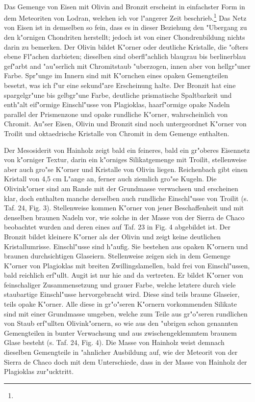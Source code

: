 \documentclass[a4paper, 11pt, oneside, polutonikogreek, german]{article}
\begin{document}
\paragraph{}
Das Gemenge von Eisen mit Olivin and Bronzit erscheint in einfachster Form in dem Meteoriten von Lodran, welchen ich vor l"angerer Zeit beschrieb.\footnote{} Das Netz von Eisen ist in demselben so fein, dass es in dieser Beziehung den "Ubergang zu den k"ornigen Chondriten herstellt; jedoch ist von einer Chondrenbildung nichts darin zu bemerken. Der Olivin bildet K"orner oder deutliche Kristalle, die "ofters ebene Fl"achen darbieten; dieselben sind oberfl"achlich blaugrau bis berlinerblau gef"arbt and "au"serlich mit Chromitstaub "uberzogen, innen aber von hellgr"uner Farbe. Spr"unge im Innern sind mit K"ornchen eines opaken Gemengteilen besetzt, was ich f"ur eine sekund"are Erscheinung halte. Der Bronzit hat eine spargelgr"une bis gelbgr"une Farbe, deutliche prismatische Spaltbarkeit und enth"alt eif"ormige Einschl"usse von Plagioklas, haarf"ormige opake Nadeln parallel der Prismenzone und opake rundliche K"orner, wahrscheinlich von Chromit. Au"ser Eisen, Olivin und Bronzit sind noch untergeordnet K"orner von Troilit und oktaedrische Kristalle von Chromit in dem Gemenge enthalten.

Der Mesosiderit von Hainholz zeigt bald ein feineres, bald ein gr"oberes Eisennetz von k"orniger Textur, darin ein k"orniges Silikatgemenge mit Troilit, stellenweise aber auch gro"se K"orner und Kristalle von Olivin liegen. Reichenbach gibt einen Kristall von 4,5 cm L"ange an, ferner auch ziemlich gro"se Kugeln. Die Olivink"orner sind am Rande mit der Grundmasse verwachsen und erscheinen klar, doch enthalten manche derselben auch rundliche Einschl"usse von Troilit (s. Taf. 24, Fig. 3). Stellenweise kommen K"orner von jener Beschaffenheit und mit denselben braunen Nadeln vor, wie solche in der Masse von der Sierra de Chaco beobachtet wurden and deren eines auf Taf. 23 in Fig. 4 abgebildet ist. Der Bronzit bildet kleinere K"orner als der Olivin und zeigt keine deutlichen Kristallumrisse. Einschl"usse sind h"aufig. Sie bestehen aus opaken K"ornern und braunen durchsichtigen Glaseiern. Stellenweise zeigen sich in dem Gemenge K"orner von Plagioklas mit breiten Zwillingslamellen, bald frei von Einschl"ussen, bald reichlich erf"ullt. Augit ist nur hie and da vertreten. Er bildet K"orner von feinschaliger Zusammensetzung und grauer Farbe, welche letztere durch viele staubartige Einschl"usse hervorgebracht wird. Diese sind teils braune Glaseier, teils opake K"orner. Alle diese in gr"o"seren K"ornern vorkommenden Silikate sind mit einer Grundmasse umgeben, welche zum Teile aus gr"o"seren rundlichen von Staub erf"ullten Olivink"ornern, so wie aus den "ubrigen schon genannten Gemengteilen in bunter Verwachsung und aus zwischengeklemmtem braunem Glase besteht (s. Taf. 24, Fig. 4). Die Masse von Hainholz weist demnach dieselben Gemengteile in "ahnlicher Ausbildung auf, wie der Meteorit von der Sierra de Chaco doch mit dem Unterschiede, dass in der Masse von Hainholz der Plagioklas zur"ucktritt.
\end{document}
